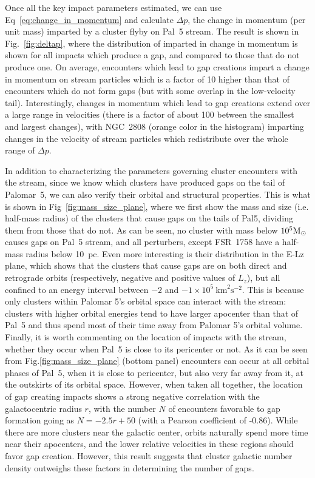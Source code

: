 \documentclass[draft]{aa}
\begin{document}
      
    Once all the key impact parameters estimated, we can use Eq~\ref{eq:change_in_momentum} and calculate $\Delta p$, the change in momentum (per unit mass) imparted by a cluster flyby on Pal~5 stream. The result  is shown in Fig.~\ref{fig:deltap}, where the distribution of imparted in change in momentum is shown for all impacts which produce a gap, and compared to those that do not produce one. On average, encounters which lead to gap creations impart a change in momentum on stream particles which is a factor of 10 higher than that of encounters which do not form gaps (but with some overlap in the low-velocity tail). Interestingly, changes in momentum which lead to gap creations extend over a large range in velocities (there is a factor of about 100 between the smallest and largest changes), with NGC~2808 (orange color in the histogram) imparting changes in the velocity of stream particles which redistribute over the whole range of $\Delta p$. 

    In addition to characterizing the parameters governing cluster encounters with the stream, since we know which clusters have produced gaps on the tail of Palomar~5, we can also verify their orbital and structural properties. This is what is shown in Fig~\ref{fig:mass_size_plane}, where we first show the mass and size (i.e. half-mass radius) of the clusters that cause gaps on the tails of Pal5, dividing them from those that do not. As can be seen, no cluster with mass below $10^5 \rm{M}_\odot$ causes gaps on Pal~5 stream, and all perturbers, except FSR~1758 have a half-mass radius below 10~pc. Even more interesting is their distribution in the E-Lz plane, which shows that the clusters that cause gaps are on both direct and retrograde orbits (respectively, negative and positive values of $L_z$), but all confined to an energy interval between $-2$ and $-1 \times10^5~\textrm{km}^2\textrm{s}^{-2}$. This is because only clusters within Palomar 5's orbital space can interact with the stream: clusters with higher orbital energies tend to have larger apocenter than that of Pal~5 and thus spend most of their time away from Palomar 5's orbital volume. Finally, it is worth commenting on the location of impacts with the stream, whether they occur when Pal~5 is close to its pericenter or not. As it can be seen from Fig.\ref{fig:mass_size_plane} (bottom panel) encounters can occur at all orbital phases of Pal~5, when it is close to pericenter, but also very far away from it, at the outskirts of its orbital space. However, when taken all together, the location of gap creating impacts shows a strong negative correlation  with the galactocentric radius $r$, with the number $N$ of encounters favorable to gap formation  going as $N = -2.5r + 50$ (with a Pearson coefficient of -0.86). While there are more clusters near the galactic center, orbits naturally spend more time near their apocenters, and the lower relative velocities in these regions should favor gap creation. However, this result suggests that cluster galactic number density outweighs these factors in determining the number of gaps.
\end{document}
